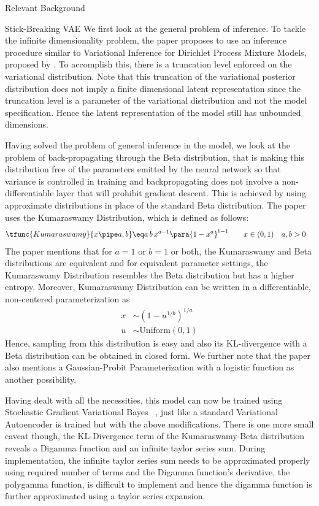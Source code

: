 \documentclass{article}
\begin{document}
\begin{psection}{Relevant Background}
\begin{psubsection}{Stick-Breaking VAE}
		We first look at the general problem of inference. To tackle the infinite dimensionality problem, the paper proposes to use an inference procedure similar to Variational Inference for Dirichlet Process Mixture Models, proposed by \cite{blei2006variational}. To accomplish this, there is a truncation level enforced on the variational distribution. Note that this truncation of the variational posterior distribution does not imply a finite dimensional latent representation since the truncation level is a parameter of the variational distribution and not the model specification. Hence the latent representation of the model still has unbounded dimensions.

		Having solved the problem of general inference in the model, we look at the problem of back-propagating through the Beta distribution, that is making this distribution free of the parameters emitted by the neural network so that variance is controlled in training and backpropagating does not involve a non-differentiable layer that will prohibit gradient descent. This is achieved by using approximate distributions in place of the standard Beta distribution. The paper uses the Kumaraswamy Distribution, which is defined as follows:
		\begin{align*}
			\tfunc{Kumaraswamy}{x \pipe a, b} &\eq a\,b\,x^{a - 1} \para{1 - x^a}^{b - 1} \qquad x\in(0,1)\quad a,b>0
		\end{align*}
		The paper mentions that for $a=1$ or $b=1$ or both, the Kumaraswamy and Beta distributions are equivalent and for equivalent parameter settings, the Kumaraswamy Distribution resembles the Beta distribution but has a higher entropy. Moreover, Kumaraswamy Distribution can be written in a differentiable, non-centered parameterization as
		\begin{align*}
			x &\sim (1-u^{1/b})^{1/a} \\
			u &\sim \text{Uniform}(0,1)
		\end{align*}
		Hence, sampling from this distribution is easy and also its KL-divergence with a Beta distribution can be obtained in closed form. We further note that the paper also mentions a Gaussian-Probit Parameterization with a logistic function as another possibility.

		Having dealt with all the necessities, this model can now be trained using Stochastic Gradient Variational Bayes ~\citep{VAE}, just like a standard Variational Autoencoder is trained but with the above modifications. There is one more small caveat though, the KL-Divergence term of the Kumaraswamy-Beta distribution reveals a Digamma function and an infinite taylor series sum. During implementation, the infinite taylor series sum needs to be approximated properly using required number of terms and the Digamma function's derivative, the polygamma function, is difficult to implement and hence the digamma function is further approximated using a taylor series expansion.
	\end{psubsection}

\end{psection}
\end{document}
